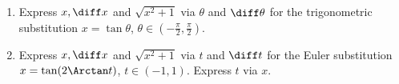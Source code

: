 \begin{enumerate}[ref={\fcProblemRef}]
\item \label{problemTheoreticalTrigSubx=tant} Express $x, \diff x $ and $\sqrt{x^2+1 }$ via $\theta$ and $\diff \theta$ for the trigonometric substitution $x=\tan \theta $, $\theta\in \left(-\frac{\pi}{2},\frac{\pi}{2}\right)$.
\item \label{problemTheoreticalTrigSubx=tan(2arctant)} Express $x, \diff x $ and $\sqrt{x^2+1}$ via $t$ and $\diff t$ for the Euler substitution $x=\tan(2\Arctan t)$, $t\in(-1,1)$. Express $t$ via $x$.
\end{enumerate}

